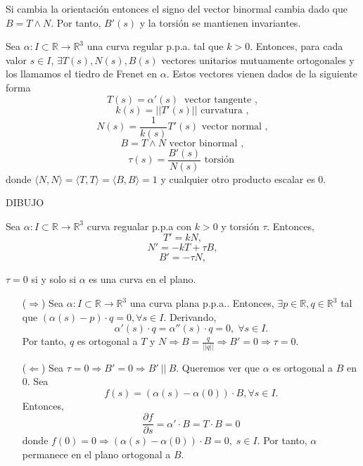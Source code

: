 \begin{obs}
  Si cambia la orientación entonces el signo del vector binormal cambia dado que $B = T \wedge N$. Por tanto, $B'(s)$ y la torsión se mantienen invariantes. 
\end{obs}

\begin{defn}
  Sea $\alpha  : I \subset \mathbb{R} \to \mathbb{R}^{3}$ una curva regular p.p.a. tal que $k>0$. Entonces, para cada valor $s \in I$, $\exists T(s), N(s), B(s)$ vectores unitarios mutuamente ortogonales y los llamamos el tiedro de Frenet en $\alpha$. Estos vectores vienen dados de la siguiente forma
  \[ 
    T(s) = \alpha'(s) \ \text{ vector tangente } ,
  \] 
  \[ 
    k(s) = ||T'(s)||  \text{ curvatura } ,
  \] 
  \[ 
    N(s) = \frac{1}{k(s)}T'(s)  \text{ vector normal } ,
  \]
  \[ 
    B = T \wedge N  \text{ vector binormal } ,
  \] 
  \[ 
    \tau(s) = \frac{B'(s)}{N(s)}  \text{ torsión } 
  \] 
  donde $\langle N{ , }N \rangle = \langle T{ , }T \rangle = \langle B{ , }B \rangle = 1$ y cualquier otro producto escalar es $0$.
\end{defn}

DIBUJO

\begin{defn}
  Sea $\alpha  : I \subset \mathbb{R} \to \mathbb{R}^{3}$ curva regualar p.p.a con $k>0$ y torsión $\tau$. Entonces, 
  \[ 
    T' = kN, 
  \] 
  \[ 
    N' = -kT + \tau B,
  \] 
  \[ 
    B' = -\tau N,
  \] 
\end{defn}

\begin{prop}
  $\tau = 0$ si y solo si $\alpha$ es una curva en el plano.
\end{prop}

\begin{dem}
  \begin{enumerate}[label=(\roman*)]
    \item [($\Rightarrow$)] Sea $\alpha  : I \subset \mathbb{R} \to \mathbb{R}^{3}$ una curva plana p.p.a.. Entonces, $\exists p \in \mathbb{R}, q \in \mathbb{R}^{3}$ tal que $(\alpha(s) - p) \cdot q = 0, \forall s \in I$. Derivando,
  \[ 
    \alpha'(s) \cdot q = \alpha''(s) \cdot q = 0, \; \forall s \in I.
  \] 
  Por tanto, $q$ es ortogonal a $T$ y $N \Rightarrow B = \frac{q}{||q||} \Rightarrow B' = 0 \Rightarrow \tau = 0$.
    \item [($\Leftarrow$)] Sea $\tau = 0 \Rightarrow B' = 0 \Rightarrow B' \ || \ B$. Queremos ver que $\alpha$ es ortogonal a $B$ en $0$. Sea 
      \[ 
        f(s) = (\alpha(s) - \alpha(0)) \cdot B, \forall s \in I .
      \] 
      Entonces,
      \[
        \frac{\partial{f}}{\partial{s}} = \alpha' \cdot B = T \cdot B = 0
      \]
      donde $f(0) = 0 \Rightarrow (\alpha(s) - \alpha(0)) \cdot B = 0, \; s \in I$. Por tanto, $\alpha$ permanece en el plano ortogonal a $B$.
  \end{enumerate}
\end{dem}

